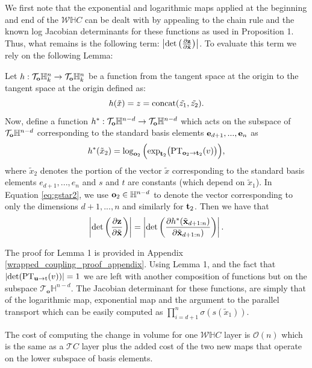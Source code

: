 \begin{proofsketch}
We first note that the exponential and logarithmic maps applied at the beginning and end of the $\mathcal{W}\mathbb{H}C$ can be dealt with by appealing to the chain rule and the known log Jacobian determinants for these functions as used in Proposition 1.  
Thus, what remains is the following term: $\left|\textrm{det}\left(\frac{\partial \mathbf{z}}{\partial \tilde{\mathbf{x}}}\right)\right|$. To evaluate this term we rely on the following Lemma:
\begin{lemma}
Let $h : \mathcal{T}_{\mathbf{o}}\mathbb{H}^n_k \rightarrow \mathcal{T}_{\mathbf{o}}\mathbb{H}^n_k$ be a function from the tangent space at the origin to the tangent space at the origin defined as:
\begin{equation}\label{eq:g2}
h(\tilde{x}) = z = \textnormal{concat}(\tilde{z_1}, \tilde{z_2}).
\end{equation}
Now, define a function $h^* : \mathcal{T}_{\mathbf{o}}\mathbb{H}^{n-d} \rightarrow \mathcal{T}_{\mathbf{o}}\mathbb{H}^{n-d}$ which acts on the subspace of $\mathcal{T}_{\mathbf{o}}\mathbb{H}^{n-d}$ corresponding to the standard basis elements $\mathbf{e}_{d+1}, ..., \mathbf{e}_n$ as
\begin{equation}\label{eq:gstar2}
h^*(\tilde{x}_{2}) =   \log_{\mathbf{o}_{2}}\Big( \textnormal{exp}_{\mathbf{t}_{2}}\big(\textnormal{PT}_{\mathbf{o}_{2} \to \mathbf{t}_{2}}(v)\big)\Big),
\end{equation}
where $\tilde{x}_{2}$ denotes the portion of the vector $\tilde{x}$ corresponding to the standard basis elements $e_{d+1}, ..., e_n$ and $s$ and $t$ are constants (which depend on $\tilde{x}_{1}$).
In Equation \eqref{eq:gstar2}, we use $\mathbf{o}_{2} \in \mathbb{H}^{n-d}$ to denote the vector corresponding to only the dimensions $d+1, ..., n$ and similarly for $\mathbf{t}_{2}$.
Then we have that
\begin{equation}
    \left|\textnormal{det}\left(\frac{\partial \mathbf{z}}{\partial \tilde{\mathbf{x}}}\right)\right| =    \left|\textnormal{det}\left(\frac{\partial h^*(\tilde{\mathbf{x}}_{d+1:n})}{\partial \tilde{\mathbf{x}}_{d+1:n})}\right)\right|.
\end{equation}
\end{lemma}
The proof for Lemma 1 is provided in Appendix \ref{wrapped_coupling_proof_appendix}. Using Lemma 1, and the fact that $|\textnormal{det}(\textnormal{PT}_{\textbf{u}\to\textnormal{t}}(v))| = 1$ \cite{nagano2019wrapped} we are left with another composition of functions but on the subspace $\mathcal{T}_{\textbf{o}}\mathbb{H}^{n-d}$. The Jacobian determinant for these functions, are simply that of the logarithmic map, exponential map and the argument to the parallel transport which can be easily computed as $\prod_{i=d+1}^n \sigma(s(\tilde{x}_1))$. 
\end{proofsketch}
The cost of computing the change in volume for one $\mathcal{W}\mathbb{H}C$ layer is $\mathcal{O}(n)$ which is the same as a $\mathcal{T}C$ layer plus the added cost of the two new maps that operate on the lower subspace of basis elements.
